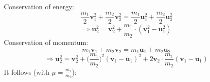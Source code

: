 \documentclass[11 pt]{article}
\begin{document}
    \begin{figure}[h!]
        \centering
        \label{}
    \end{figure}

    \noindent
    Conservation of energy:
    \begin{equation}
        \frac{m_1}{2}\textbf{v}_1^2+\frac{m_2}{2}\textbf{v}_2^2
        =\frac{m_1}{2}\textbf{u}_1^2+\frac{m_2}{2}\textbf{u}_2^2
    \end{equation}
    \begin{equation}
        \Rightarrow\textbf{u}_2^2
        =\textbf{v}_2^2+\frac{m_1}{m_2}\cdot(\textbf{v}_1^2-\textbf{u}_1^2)
    \end{equation}
    Conservation of momentum:
    \begin{equation}
        m_1\textbf{v}_1+m_2\textbf{v}_2= m_1\textbf{u}_1+m_2\textbf{u}_2
    \end{equation}
    \begin{equation}
        \Rightarrow\textbf{u}_2^2
        =\textbf{v}_2^2+\bigg(\frac{m_1}{m_2}\bigg)^2(\textbf{v}_1-\textbf{u}_1)^2
        +2\textbf{v}_2\cdot\frac{m_1}{m_2}(\textbf{v}_1-\textbf{u}_1)
    \end{equation}
    It follows (with $\mu=\frac{m_1}{m_2}$):
\end{document}
